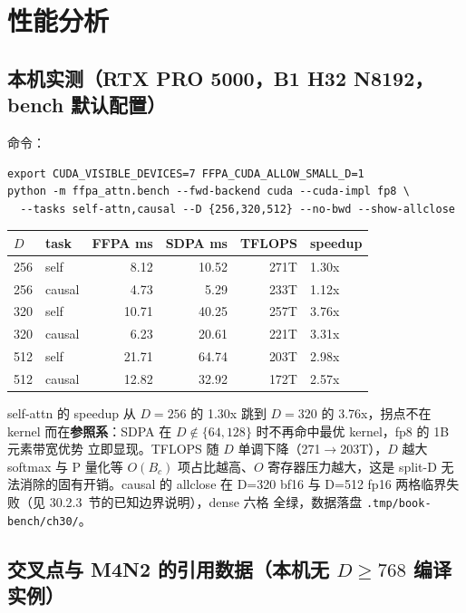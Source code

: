 \FloatBarrier

\section{性能分析}

\subsection{本机实测（RTX PRO 5000，B1 H32 N8192，bench 默认配置）}

命令：
\begin{lstlisting}[style=console,aboveskip=4pt,belowskip=2pt]
export CUDA_VISIBLE_DEVICES=7 FFPA_CUDA_ALLOW_SMALL_D=1
python -m ffpa_attn.bench --fwd-backend cuda --cuda-impl fp8 \
  --tasks self-attn,causal --D {256,320,512} --no-bwd --show-allclose
\end{lstlisting}

\begin{center}
\begin{tabular}{@{}llrrrl@{}}
\toprule
$D$ & task & FFPA ms & SDPA ms & TFLOPS & speedup \\
\midrule
256 & self   & 8.12  & 10.52 & 271T & 1.30x \\
256 & causal & 4.73  & 5.29  & 233T & 1.12x \\
320 & self   & 10.71 & 40.25 & 257T & 3.76x \\
320 & causal & 6.23  & 20.61 & 221T & 3.31x \\
512 & self   & 21.71 & 64.74 & 203T & 2.98x \\
512 & causal & 12.82 & 32.92 & 172T & 2.57x \\
\bottomrule
\end{tabular}
\end{center}

self-attn 的 speedup 从 $D=256$ 的 1.30x 跳到
$D=320$ 的 3.76x，拐点不在 kernel 而在\textbf{参照系}：SDPA 在
$D\notin\{64,128\}$ 时不再命中最优 kernel，fp8 的 1B 元素带宽优势
立即显现。TFLOPS 随 $D$ 单调下降（271$\to$203T），$D$ 越大
softmax 与 P 量化等 $O(B_c)$ 项占比越高、$O$ 寄存器压力越大，这是
split-D 无法消除的固有开销。causal 的 allclose 在 D=320 bf16 与
D=512 fp16 两格临界失败（见 30.2.3~节的已知边界说明），dense 六格
全绿，数据落盘 \texttt{.tmp/book-bench/ch30/}。

\subsection{交叉点与 M4N2 的引用数据（本机无 $D\ge768$ 编译实例）}

